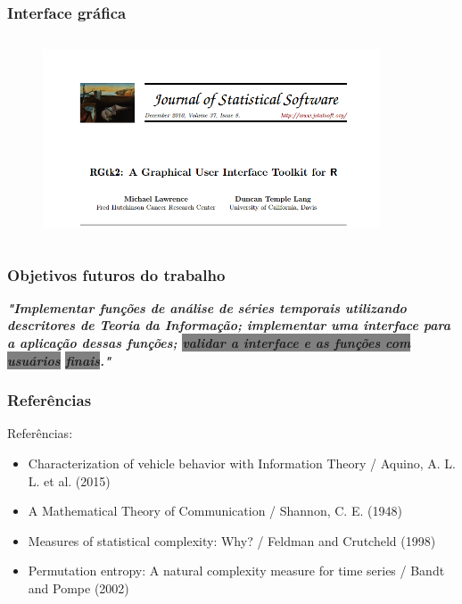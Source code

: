 \documentclass[10pt, compress]{beamer}
\begin{document}
\begin{frame}[fragile]
\frametitle{Interface gráfica}
\begin{figure}
  \centering
   \includegraphics[width=10cm,height=6cm]{rgtk2.png}
\end{figure}
\end{frame}

\begin{frame}[fragile]
\frametitle{Objetivos futuros do trabalho}
\begin{sloppypar}
\textit{\textbf{\Large "Implementar funções de análise de séries temporais utilizando descritores de Teoria da Informação; implementar uma interface para a aplicação dessas funções; \colorbox{gray}{validar a interface e as funções com usuários} \colorbox{gray}{finais}."}}
\end{sloppypar}
\end{frame}

\begin{frame}[fragile]
  \frametitle{Referências}
Referências: 
\begin{itemize}

\item{Characterization of vehicle behavior with Information Theory / Aquino, A. L. L. et al. (2015)}

\item{A Mathematical Theory of Communication / Shannon, C. E. (1948)}

\item{Measures of statistical complexity: Why? / Feldman and Crutcheld (1998)}

\item{Permutation entropy: A natural complexity measure for time series / Bandt and Pompe (2002)}

\end{itemize}
\end{frame}

\end{document}
